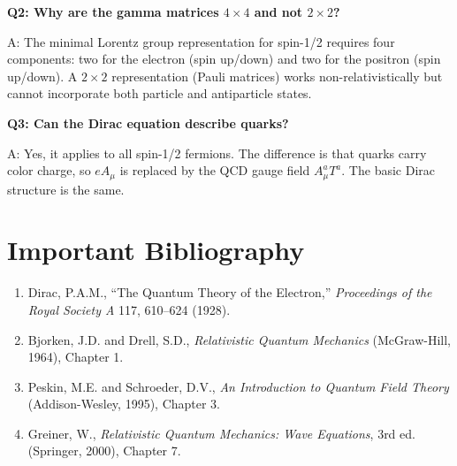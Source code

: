 \textbf{Q2: Why are the gamma matrices $4\times 4$ and not $2\times 2$?}

A: The minimal Lorentz group representation for spin-1/2 requires four components: two for the electron (spin up/down) and two for the positron (spin up/down). A $2\times 2$ representation (Pauli matrices) works non-relativistically but cannot incorporate both particle and antiparticle states.

\textbf{Q3: Can the Dirac equation describe quarks?}

A: Yes, it applies to all spin-1/2 fermions. The difference is that quarks carry color charge, so $eA_\mu$ is replaced by the QCD gauge field $A_\mu^a T^a$. The basic Dirac structure is the same.
\section*{Important Bibliography}

\begin{enumerate}
\item Dirac, P.A.M., ``The Quantum Theory of the Electron,'' \textit{Proceedings of the Royal Society A} 117, 610--624 (1928).
\item Bjorken, J.D. and Drell, S.D., \textit{Relativistic Quantum Mechanics} (McGraw-Hill, 1964), Chapter 1.
\item Peskin, M.E. and Schroeder, D.V., \textit{An Introduction to Quantum Field Theory} (Addison-Wesley, 1995), Chapter 3.
\item Greiner, W., \textit{Relativistic Quantum Mechanics: Wave Equations}, 3rd ed. (Springer, 2000), Chapter 7.
\end{enumerate}


